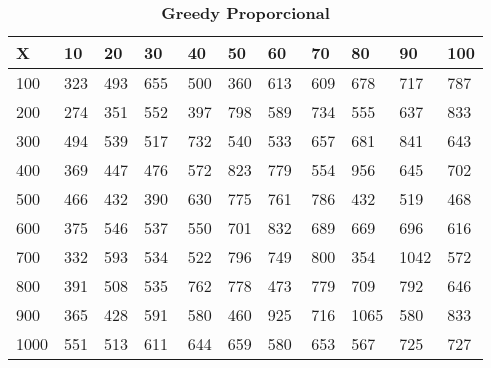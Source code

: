 \documentclass[10pt,letterpaper]{article}
\begin{document}
\begin{center}
\begin{table}\renewcommand{\arraystretch}{2.5}
\caption{\large \textbf{Greedy Proporcional}}
\centering
\begin{tabular} { |m{0.5cm}|m{1.3cm}|m{1.3cm}|m{1.3cm}|m{1.3cm}|m{1.3cm}|m{1.3cm}|m{1.3cm}|m{1.3cm}|m{1.3cm}|m{1.3cm}|} 
\hline
\rowcolor{Gray}
\centering \textbf{X} & \centering \textbf{10} & \centering \textbf{20} & \centering \textbf{30}\ & \centering \textbf{40} & \centering \textbf{50} & \centering \textbf{60}\ & \centering \textbf{70} & \centering \textbf{80} & \centering \textbf{90}\ & \textbf{100} \\\hline
\cellcolor{Gray}100 & \Large 323 & \Large 493 & \Large 655 & \Large 500 & \Large 360 & \Large 613 & \Large 609 & \Large 678 & \Large 717 & \Large 787 \\
\hline
\cellcolor{Gray}200 & \Large 274 & \Large 351 & \Large 552 & \Large 397 & \Large 798 & \Large 589 & \Large 734 & \Large 555 & \Large 637 & \Large 833 \\
\hline
\cellcolor{Gray}300 & \Large 494 & \Large 539 & \Large 517 & \Large 732 & \Large 540 & \Large 533 & \Large 657 & \Large 681 & \Large 841 & \Large 643 \\
\hline
\cellcolor{Gray}400 & \Large 369 & \Large 447 & \Large 476 & \Large 572 & \Large 823 & \Large 779 & \Large 554 & \Large 956 & \Large 645 & \Large 702 \\
\hline
\cellcolor{Gray}500 & \Large 466 & \Large 432 & \Large 390 & \Large 630 & \Large 775 & \Large 761 & \Large 786 & \Large 432 & \Large 519 & \Large 468 \\
\hline
\cellcolor{Gray}600 & \Large 375 & \Large 546 & \Large 537 & \Large 550 & \Large 701 & \Large 832 & \Large 689 & \Large 669 & \Large 696 & \Large 616 \\
\hline
\cellcolor{Gray}700 & \Large 332 & \Large 593 & \Large 534 & \Large 522 & \Large 796 & \Large 749 & \Large 800 & \Large 354 & \Large 1042 & \Large 572 \\
\hline
\cellcolor{Gray}800 & \Large 391 & \Large 508 & \Large 535 & \Large 762 & \Large 778 & \Large 473 & \Large 779 & \Large 709 & \Large 792 & \Large 646 \\
\hline
\cellcolor{Gray}900 & \Large 365 & \Large 428 & \Large 591 & \Large 580 & \Large 460 & \Large 925 & \Large 716 & \Large 1065 & \Large 580 & \Large 833 \\
\hline
\cellcolor{Gray}1000 & \Large 551 & \Large 513 & \Large 611 & \Large 644 & \Large 659 & \Large 580 & \Large 653 & \Large 567 & \Large 725 & \Large 727 \\
\hline
\end{tabular} \\
\end{table}
\end{center}
\end{document}
